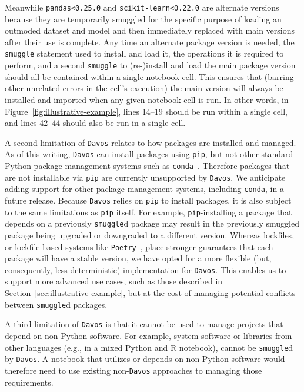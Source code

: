 \documentclass[preprint,12pt,a4paper]{elsarticle}
\begin{document}
Meanwhile \texttt{pandas<0.25.0} and \texttt{scikit-learn<0.22.0} are alternate versions because they are temporarily smuggled for the specific purpose of loading an outmoded dataset and model and then immediately replaced with main versions after their use is complete.
Any time an alternate package version is needed, the \texttt{smuggle} statement used to install and load it, the operations it is required to perform, and a second \texttt{smuggle} to (re-)install and load the main package version should all be contained within a single notebook cell.
This ensures that (barring other unrelated errors in the cell's execution) the main version will always be installed and imported when any given notebook cell is run.
In other words, in Figure~\ref{fig:illustrative-example}, lines 14--19 should be run within a single cell, and lines 42--44 should also be run in a single cell.

A second limitation of \texttt{Davos} relates to how packages are installed and managed.
As of this writing, \texttt{Davos} can install packages using \texttt{pip}, but not
other standard Python package management systems such as \texttt{conda}~\cite{Anac12}.
Therefore packages that are not installable via \texttt{pip} are currently
unsupported by \texttt{Davos}. We anticipate adding support for other package management
systems, including \texttt{conda}, in a future release.  Because \texttt{Davos} relies on
\texttt{pip} to install packages, it is also subject to the same limitations as
\texttt{pip} itself. For example, \texttt{pip}-installing a package that depends on
a previously \texttt{smuggle}d package may result in the previously smuggled package
being upgraded or downgraded to a different version. Whereas lockfiles, or lockfile-based
systems like \texttt{Poetry}~\citep{poetry}, place stronger guarantees that each package will
have a stable version, we have opted for a more flexible (but, consequently, less
deterministic) implementation for \texttt{Davos}.  This enables us to support
more advanced use cases, such as those described in Section~\ref{sec:illustrative-example},
but at the cost of managing potential conflicts between \texttt{smuggle}d
packages.

A third limitation of \texttt{Davos} is that it cannot be used to manage projects that
depend on non-Python software. For example, system software or libraries from
other languages (e.g., in a mixed Python and R notebook), cannot be
\texttt{smuggle}d by \texttt{Davos}. A notebook that utilizes or depends on non-Python
software would therefore need to use existing non-\texttt{Davos} approaches to managing
those requirements.
\end{document}
